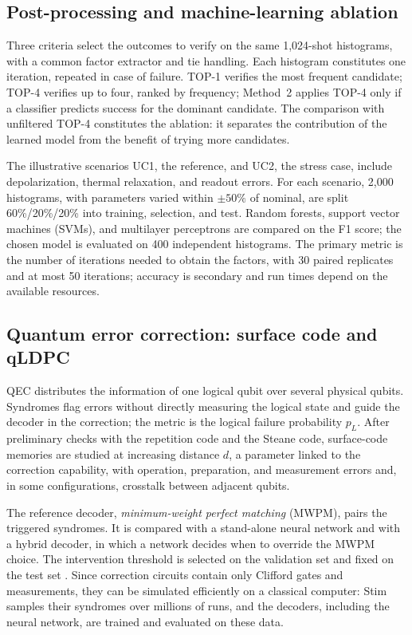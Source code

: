 \subsection{Post-processing and machine-learning ablation}

Three criteria select the outcomes to verify on the same 1,024-shot histograms, with a
common factor extractor and tie handling. Each histogram constitutes one iteration,
repeated in case of failure. TOP-1 verifies the most frequent candidate; TOP-4 verifies up
to four, ranked by frequency; Method~2 applies TOP-4 only if a classifier predicts success
for the dominant candidate. The comparison with unfiltered TOP-4 constitutes the ablation:
it separates the contribution of the learned model from the benefit of trying more
candidates.

The illustrative scenarios UC1, the reference, and UC2, the stress case, include
depolarization, thermal relaxation, and readout errors. For each scenario, 2,000
histograms, with parameters varied within \(\pm50\%\) of nominal, are split 60\%/20\%/20\%
into training, selection, and test. Random forests, support vector machines (SVMs), and
multilayer perceptrons are compared on the F1 score; the chosen model is evaluated on 400
independent histograms. The primary metric is the number of iterations needed to obtain the
factors, with 30 paired replicates and at most 50 iterations; accuracy is secondary and run
times depend on the available resources.

\subsection{Quantum error correction: surface code and qLDPC}

QEC distributes the information of one logical qubit over several physical qubits.
Syndromes flag errors without directly measuring the logical state and guide the decoder in
the correction; the metric is the logical failure probability \(p_L\). After preliminary
checks with the repetition code and the Steane code, surface-code memories
\cite{en-steane1996,en-fowler2012,en-googleQECBelowThreshold2025} are studied at increasing
distance \(d\), a parameter linked to the correction capability, with operation,
preparation, and measurement errors and, in some configurations, crosstalk between adjacent
qubits.

The reference decoder, \emph{minimum-weight perfect matching} (MWPM), pairs the triggered
syndromes. It is compared with a stand-alone neural network and with a hybrid decoder, in
which a network decides when to override the MWPM choice. The intervention threshold is
selected on the validation set and fixed on the test set \cite{en-alphaqubit2024}. Since
correction circuits contain only Clifford gates and measurements, they can be simulated
efficiently on a classical computer: Stim samples their syndromes over millions of runs,
and the decoders, including the neural network, are trained and evaluated on these data.


